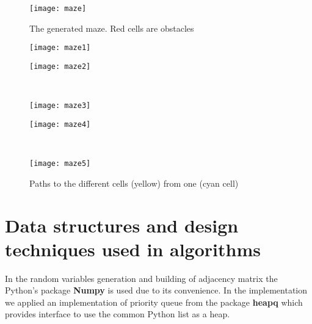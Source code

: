 \documentclass[12pt, bachelor, substylefile = algo_title.rtx]{disser}
\theoremstyle{definition}
\begin{document}
\begin{figure}[!h]
\begin{center}
\texttt{[image: maze]}
\caption{The generated maze. Red cells are obstacles}
\label{fig: 3}
\end{center}
\end{figure}


\begin{figure}[!h]
   \begin{minipage}{0.48\textwidth}
     \centering
     \texttt{[image: maze1]}
	\label{fig: 4}
   \end{minipage}\hfill
   \begin{minipage}{0.48\textwidth}
     \centering
     \texttt{[image: maze2]}
	\label{fig: 5}
   \end{minipage}\\
\begin{minipage}{0.48\textwidth}
     \centering
     \texttt{[image: maze3]}
	\label{fig: 6}
   \end{minipage}\hfill
   \begin{minipage}{0.48\textwidth}
     \centering
     \texttt{[image: maze4]}
	\label{fig: 7}
   \end{minipage}\\
\centering
\begin{minipage}{0.48\textwidth}
     \centering
     \texttt{[image: maze5]}
	\label{fig: 8}
   \end{minipage}
\caption{Paths to the different cells (yellow) from one (cyan cell)}
\label{fig: all}
\end{figure}


\section{Data structures and design techniques used in algorithms}
In the random variables generation and building of adjacency matrix the Python's package \textbf{Numpy} is used due to its convenience. In the implementation we applied an implementation of priority queue from the package \textbf{heapq} which provides interface to use the common Python list as a heap.
\end{document}
